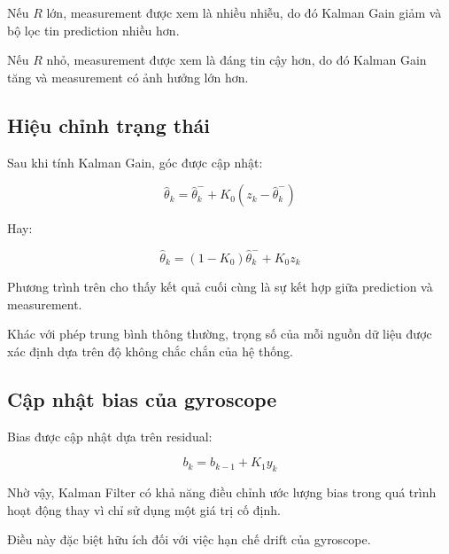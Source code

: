 \documentclass[a4paper,12pt]{report}
\begin{document}
Nếu $R$ lớn, measurement được xem là nhiều nhiễu, do đó Kalman Gain giảm và bộ lọc tin prediction nhiều hơn.

Nếu $R$ nhỏ, measurement được xem là đáng tin cậy hơn, do đó Kalman Gain tăng và measurement có ảnh hưởng lớn hơn.


\subsection{Hiệu chỉnh trạng thái}

Sau khi tính Kalman Gain, góc được cập nhật:

\begin{equation}
\hat{\theta}_k
=
\hat{\theta}_k^{-}
+
K_0
\left(
z_k-\hat{\theta}_k^{-}
\right)
\end{equation}

Hay:

\begin{equation}
\hat{\theta}_k
=
(1-K_0)\hat{\theta}_k^{-}
+
K_0z_k
\end{equation}

Phương trình trên cho thấy kết quả cuối cùng là sự kết hợp giữa prediction và measurement.

Khác với phép trung bình thông thường, trọng số của mỗi nguồn dữ liệu được xác định dựa trên độ không chắc chắn của hệ thống.


\subsection{Cập nhật bias của gyroscope}

Bias được cập nhật dựa trên residual:

\begin{equation}
b_k
=
b_{k-1}
+
K_1y_k
\end{equation}

Nhờ vậy, Kalman Filter có khả năng điều chỉnh ước lượng bias trong quá trình hoạt động thay vì chỉ sử dụng một giá trị cố định.

Điều này đặc biệt hữu ích đối với việc hạn chế drift của gyroscope.

\end{document}
